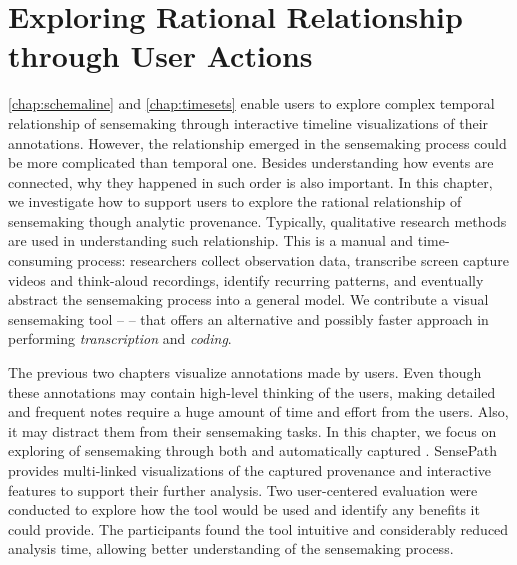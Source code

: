 \chapter{Exploring Rational Relationship through User Actions}
\label{chap:sensepath}

\graphicspath{{Chapter5/figures/}}

\autoref{chap:schemaline} and \autoref{chap:timesets} enable users to explore complex temporal relationship of sensemaking through interactive timeline visualizations of their annotations. However, the relationship emerged in the sensemaking process could be more complicated than temporal one. Besides understanding how events are connected, why they happened in such order is also important. In this chapter, we investigate how to support users to explore the rational relationship of sensemaking though analytic provenance. Typically, qualitative research methods are used in understanding such relationship. This is a manual and time-consuming process: researchers collect observation data, transcribe screen capture videos and think-aloud recordings, identify recurring patterns, and eventually abstract the sensemaking process into a general model. We contribute a visual sensemaking tool -- \emph{} -- that offers an alternative and possibly faster approach in performing \emph{transcription} and \emph{coding}. 

The previous two chapters visualize annotations made by users. Even though these annotations may contain high-level thinking of the users, making detailed and frequent notes require a huge amount of time and effort from the users. Also, it may distract them from their sensemaking tasks. In this chapter, we focus on exploring  of sensemaking through both  and automatically captured . SensePath provides multi-linked visualizations of the captured provenance and interactive features to support their further analysis. Two user-centered evaluation were conducted to explore how the tool would be used and identify any benefits it could provide. The participants found the tool intuitive and considerably reduced analysis time, allowing better understanding of the sensemaking process.






